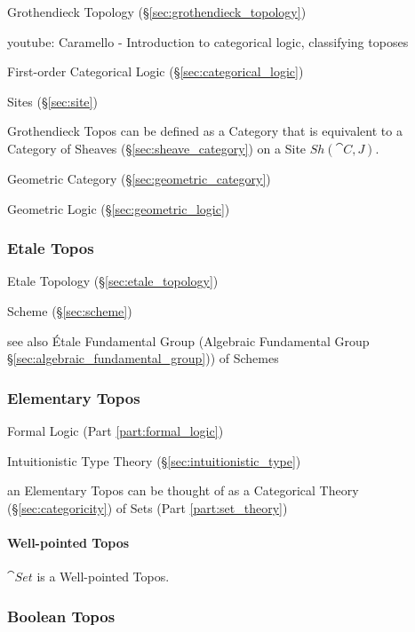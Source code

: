 Grothendieck Topology (\S\ref{sec:grothendieck_topology})

youtube: Caramello - Introduction to categorical logic, classifying
toposes

First-order Categorical Logic (\S\ref{sec:categorical_logic})

Sites (\S\ref{sec:site})

Grothendieck Topos can be defined as a Category that is equivalent to
a Category of Sheaves (\S\ref{sec:sheave_category}) on a Site
$Sh(\cat{C},J)$.

Geometric Category (\S\ref{sec:geometric_category})

Geometric Logic (\S\ref{sec:geometric_logic})



\subsubsection{Etale Topos}\label{sec:etale_topos}

Etale Topology (\S\ref{sec:etale_topology})

Scheme (\S\ref{sec:scheme})

see also \'Etale Fundamental Group (Algebraic Fundamental Group
\S\ref{sec:algebraic_fundamental_group})) of Schemes



\subsubsection{Elementary Topos}\label{sec:elementary_topos}

Formal Logic (Part \ref{part:formal_logic})

Intuitionistic Type Theory (\S\ref{sec:intuitionistic_type})

an Elementary Topos can be thought of as a Categorical Theory
(\S\ref{sec:categoricity}) of Sets (Part \ref{part:set_theory})



\paragraph{Well-pointed Topos}\label{sec:wellpointed_topos}\hfill

$\cat{Set}$ is a Well-pointed Topos.



\subsubsection{Boolean Topos}\label{sec:boolean_topos}

